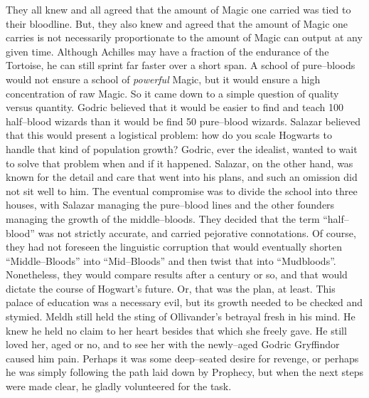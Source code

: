 They all knew and all agreed that the amount of Magic one carried was tied to their bloodline. But, they also knew and agreed that the amount of Magic one carries is not necessarily proportionate to the amount of Magic can output at any given time. Although Achilles may have a fraction of the endurance of the Tortoise, he can still sprint far faster over a short span. A school of pure\mbox{--}bloods would not ensure a school of \emph{powerful} Magic, but it would ensure a high concentration of raw Magic.
\SmallVSpace
So it came down to a simple question of quality versus quantity. Godric believed that it would be easier to find and teach 100 half\mbox{--}blood wizards than it would be find 50 pure\mbox{--}blood wizards. Salazar believed that this would present a logistical problem: how do you scale Hogwarts to handle that kind of population growth? Godric, ever the idealist, wanted to wait to solve that problem when and if it happened. Salazar, on the other hand, was known for the detail and care that went into his plans, and such an omission did not sit well to him.
\SmallVSpace
The eventual compromise was to divide the school into three houses, with Salazar managing the pure\mbox{--}blood lines and the other founders managing the growth of the middle\mbox{--}bloods. They decided that the term “half\mbox{--}blood” was not strictly accurate, and carried pejorative connotations. Of course, they had not foreseen the linguistic corruption that would eventually shorten “Middle\mbox{--}Bloods” into “Mid\mbox{--}Bloods” and then twist that into “Mudbloods”. Nonetheless, they would compare results after a century or so, and that would dictate the course of Hogwart’s future.
\SmallVSpace
Or, that was the plan, at least. This palace of education was a necessary evil, but its growth needed to be checked and stymied. Meldh still held the sting of Ollivander’s betrayal fresh in his mind. He knew he held no claim to her heart besides that which she freely gave. He still loved her, aged or no, and to see her with the newly\mbox{--}aged Godric Gryffindor caused him pain. Perhaps it was some deep\mbox{--}seated desire for revenge, or perhaps he was simply following the path laid down by Prophecy, but when the next steps were made clear, he gladly volunteered for the task.
\simpleline
{}

